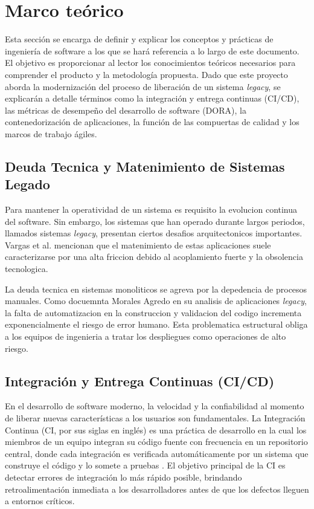 \section{Marco teórico}
Esta sección se encarga de definir y explicar los conceptos y prácticas de ingeniería de 
software a los que se hará referencia a lo largo de este documento. El objetivo es 
proporcionar al lector los conocimientos teóricos necesarios para comprender el producto y 
la metodología propuesta. Dado que este proyecto aborda la modernización del proceso de 
liberación de un sistema \emph{legacy}, se explicarán a detalle términos como la integración y 
entrega continuas (CI/CD), las métricas de desempeño del desarrollo de software (DORA), la 
contenedorización de aplicaciones, la función de las compuertas de calidad y los marcos de trabajo ágiles.

\subsection{Deuda Tecnica y Matenimiento de Sistemas Legado}
Para mantener la operatividad de un sistema es requisito la evolucion continua del software. Sin embargo,
los sistemas que han operado durante largos periodos, llamados sistemas \emph{legacy}, presentan
ciertos desafios arquitectonicos importantes. Vargas et al. \cite{Vargas2021} mencionan que el matenimiento de
estas aplicaciones suele caracterizarse por una alta friccion debido al acoplamiento fuerte y la obsolencia
tecnologica.

La deuda tecnica en sistemas monoliticos se agreva por la depedencia de procesos manuales. Como docuemnta Morales Agredo
\cite{MoralesAgredo2021} en su analisis de aplicaciones \emph{legacy}, la falta de automatizacion en la
construccion y validacion del codigo incrementa exponencialmente el riesgo de error humano. Esta problematica
estructural obliga a los equipos de ingenieria a tratar los despliegues como operaciones de alto riesgo.

\subsection{Integración y Entrega Continuas (CI/CD)}
En el desarrollo de software moderno, la velocidad y la confiabilidad al momento de liberar nuevas 
características a los usuarios son fundamentales. La Integración Continua (CI, por sus siglas en inglés) 
es una práctica de desarrollo en la cual los miembros de un equipo integran su código fuente con 
frecuencia en un repositorio central, donde cada integración es verificada automáticamente 
por un sistema que construye el código y lo somete a pruebas \cite{Laukkanen2017}. 
El objetivo principal de la CI es detectar errores de integración lo más rápido posible, 
brindando retroalimentación inmediata a los desarrolladores antes de que los defectos lleguen 
a entornos críticos. 

